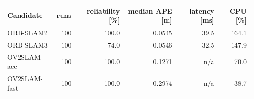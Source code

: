 \begin{tabular}{lrrrrr}
\toprule
Candidate & runs & reliability [\%] & median APE [m] & latency [ms] & CPU [\%] \\
\midrule
ORB-SLAM2 & 100 & 100.0 & 0.0545 & 39.5 & 164.1 \\
ORB-SLAM3 & 100 & 74.0 & 0.0546 & 32.5 & 147.9 \\
OV2SLAM-acc & 100 & 100.0 & 0.1271 & n/a & 70.0 \\
OV2SLAM-fast & 100 & 100.0 & 0.2974 & n/a & 38.7 \\
\bottomrule
\end{tabular}
